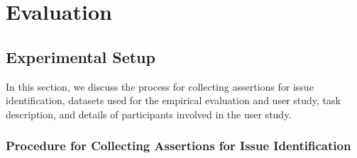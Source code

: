 \section{Evaluation}\label{sec:EVALUATION}

\subsection{Experimental Setup}
In this section, we discuss the process for collecting assertions for issue identification, datasets used for the empirical evaluation and user study, task description, and details of participants involved in the user study.


\subsubsection{Procedure for Collecting Assertions for Issue Identification}\label{bugconditions}

